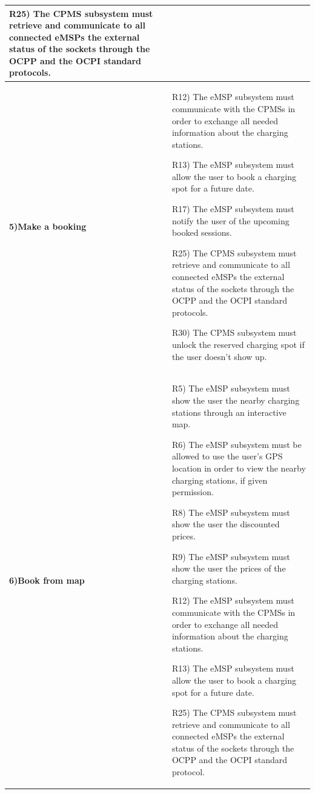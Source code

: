 \documentclass[table, 12pt]{article} %
\begin{document}
\begin{itemize}
\begin{longtable}{|p{}|p{}|}
                    R25) The CPMS subsystem must retrieve and communicate to all connected eMSPs the external status of the sockets through the OCPP and the OCPI standard protocols.
                    \\\hline
                    
                    \cellcolor{SpringGreen!50}\textbf{5)Make a booking}\centering & 
                    R12) The eMSP subsystem must communicate with the CPMSs in order to exchange all needed information about the charging stations.

                    R13) The eMSP subsystem must allow the user to book a charging spot for a future date.

                    R17) The eMSP subsystem must notify the user of the upcoming booked sessions.
                    
                    R25) The CPMS subsystem must retrieve and communicate to all connected eMSPs the external status of the sockets through the OCPP and the OCPI standard protocols.
                    
                    R30) The CPMS subsystem must unlock the reserved charging spot if the user doesn't show up.
                    \\\hline


                    \cellcolor{SpringGreen!50}\textbf{6)Book from map}\centering & 
                    R5) The eMSP subsystem must show the user the nearby charging stations through an interactive map.

                    R6) The eMSP subsystem must be allowed to use the user's GPS location in order to view the nearby charging stations, if given permission.

                    R8) The eMSP subsystem must show the user the discounted prices.

                    R9) The eMSP subsystem must show the user the prices of the charging stations.

                    R12) The eMSP subsystem must communicate with the CPMSs in order to exchange all needed information about the charging stations.

                    R13) The eMSP subsystem must allow the user to book a charging spot for a future date.

                    R25) The CPMS subsystem must retrieve and communicate to all connected eMSPs the external status of the sockets through the OCPP and the OCPI standard protocol.
                    

\end{longtable}
\end{itemize}
\end{document}
